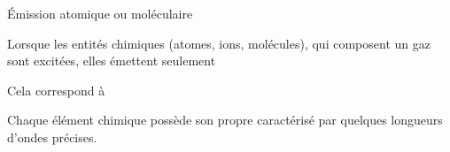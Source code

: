 \begin{doc}{Émission atomique ou moléculaire}
  \vspace{-24pt}
  \begin{encart}
    Lorsque les entités chimiques (atomes, ions, molécules), qui composent un gaz \\[8pt]
    sont excitées, elles émettent seulement \reponseLigne
    
    Cela correspond à \dotfill %
  \end{encart}
    
  Chaque élément chimique possède son propre  caractérisé par quelques longueurs d'ondes précises.
\end{doc}